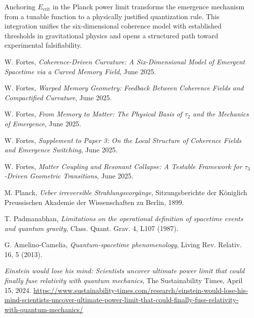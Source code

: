 \documentclass[12pt]{article}
\begin{document}
Anchoring $E_\text{crit}$ in the Planck power limit transforms the emergence mechanism from a tunable function to a physically justified quantization rule. This integration unifies the six-dimensional coherence model with established thresholds in gravitational physics and opens a structured path toward experimental falsifiability.

\begin{thebibliography}{9}

 W. Fortes, \textit{Coherence-Driven Curvature: A Six-Dimensional Model of Emergent Spacetime via a Curved Memory Field}, June 2025.

 W. Fortes, \textit{Warped Memory Geometry: Feedback Between Coherence Fields and Compactified Curvature}, June 2025.

 W. Fortes, \textit{From Memory to Matter: The Physical Basis of $\tau_2$ and the Mechanics of Emergence}, June 2025.

 W. Fortes, \textit{Supplement to Paper 3: On the Local Structure of Coherence Fields and Emergence Switching}, June 2025.

 W. Fortes, \textit{Matter Coupling and Resonant Collapse: A Testable Framework for $\tau_3$-Driven Geometric Transitions}, June 2025.

 M. Planck, \textit{Ueber irreversible Strahlungsvorg\"ange}, Sitzungsberichte der K\"oniglich Preussischen Akademie der Wissenschaften zu Berlin, 1899.

 T. Padmanabhan, \textit{Limitations on the operational definition of spacetime events and quantum gravity}, Class. Quant. Grav. 4, L107 (1987).

 G. Amelino-Camelia, \textit{Quantum-spacetime phenomenology}, Living Rev. Relativ. 16, 5 (2013).

 \textit{Einstein would lose his mind: Scientists uncover ultimate power limit that could finally fuse relativity with quantum mechanics}, The Sustainability Times, April 15, 2024. \url{https://www.sustainability-times.com/research/einstein-would-lose-his-mind-scientists-uncover-ultimate-power-limit-that-could-finally-fuse-relativity-with-quantum-mechanics/}

\end{thebibliography}
\end{document}
